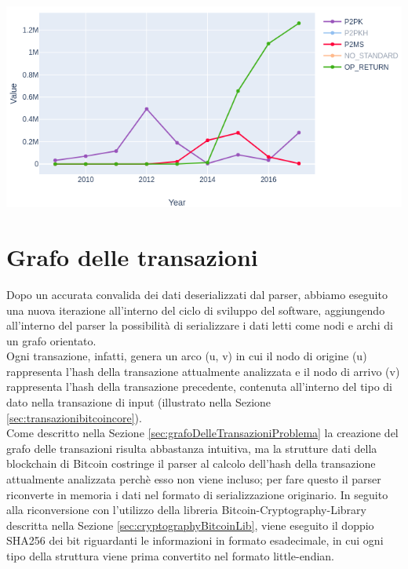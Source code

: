 {\centering
\vspace{15pt}
\includegraphics[scale=0.5]{images/OP_RETUTN_chart.png}
\vspace{10pt}
\par}


\section{Grafo delle transazioni} \label{sec:solGraphTX}

Dopo un accurata convalida dei dati deserializzati dal parser, abbiamo eseguito una nuova iterazione all'interno del ciclo di sviluppo del software, aggiungendo all'interno del parser la possibilità di serializzare i dati letti come nodi e archi di un grafo orientato.\\
Ogni transazione, infatti, genera un arco (u, v) in cui il nodo di origine (u) rappresenta l'hash della transazione attualmente analizzata e il nodo di arrivo (v) rappresenta l'hash della transazione precedente, contenuta all'interno del tipo di dato  nella transazione di input (illustrato nella Sezione \ref{sec:transazionibitcoincore}).\\
Come descritto nella Sezione \ref{sec:grafoDelleTransazioniProblema} la creazione del grafo delle transazioni risulta abbastanza intuitiva, ma la strutture dati della blockchain di Bitcoin costringe il parser al calcolo dell'hash della transazione attualmente analizzata perchè esso non viene incluso; per fare questo il parser riconverte in memoria i dati nel formato di serializzazione originario.
In seguito alla riconversione con l'utilizzo della libreria Bitcoin-Cryptography-Library descritta nella Sezione \ref{sec:cryptographyBitcoinLib}, viene eseguito il doppio SHA256 dei bit riguardanti le informazioni in formato esadecimale, in cui ogni tipo della struttura viene prima convertito nel formato little-endian.\\

